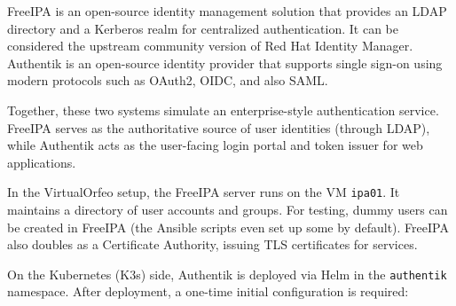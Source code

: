 FreeIPA is an open-source identity management solution that provides an LDAP directory and a Kerberos realm for centralized authentication. It can be considered the upstream community version of Red Hat Identity Manager. Authentik is an open-source identity provider that supports single sign-on using modern protocols such as OAuth2, OIDC, and also SAML.  

Together, these two systems simulate an enterprise-style authentication service. FreeIPA serves as the authoritative source of user identities (through LDAP), while Authentik acts as the user-facing login portal and token issuer for web applications.

\medskip

In the VirtualOrfeo setup, the FreeIPA server runs on the VM \texttt{ipa01}. It maintains a directory of user accounts and groups. For testing, dummy users can be created in FreeIPA (the Ansible scripts even set up some by default). FreeIPA also doubles as a Certificate Authority, issuing TLS certificates for services.  

On the Kubernetes (K3s) side, Authentik is deployed via Helm in the \texttt{authentik} namespace. After deployment, a one-time initial configuration is required:  

